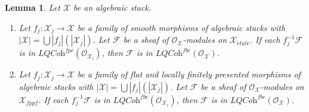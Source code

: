 \documentclass{stacks-project}
\theoremstyle{plain}
\newtheorem{lemma}[subsection]{Lemma}
\theoremstyle{definition}
\theoremstyle{remark}
\numberwithin{equation}{subsection}
\def\etale{{\acute{e}tale}}
\begin{document}
\begin{lemma}
\label{lemma-check-lqc-fbc-on-covering}
Let $\mathcal{X}$ be an algebraic stack.
\begin{enumerate}
\item Let $f_j : \mathcal{X}_j \to \mathcal{X}$ be a family of smooth
morphisms of algebraic stacks with
$|\mathcal{X}| =\bigcup |f_j|(|\mathcal{X}_j|)$.
Let $\mathcal{F}$ be a sheaf of $\mathcal{O}_\mathcal{X}$-modules
on $\mathcal{X}_\etale$. If each $f_j^{-1}\mathcal{F}$
is in $\textit{LQCoh}^{fpc}(\mathcal{O}_{\mathcal{X}_i})$, then
$\mathcal{F}$ is in
$\textit{LQCoh}^{fbc}(\mathcal{O}_\mathcal{X})$.
\item  Let $f_j : \mathcal{X}_j \to \mathcal{X}$ be a family of flat
and locally finitely presented morphisms of algebraic stacks with
$|\mathcal{X}| =\bigcup |f_j|(|\mathcal{X}_j|)$.
Let $\mathcal{F}$ be a sheaf of $\mathcal{O}_\mathcal{X}$-modules
on $\mathcal{X}_{fppf}$. If each $f_j^{-1}\mathcal{F}$
is in $\textit{LQCoh}^{fbc}(\mathcal{O}_{\mathcal{X}_i})$, then
$\mathcal{F}$ is in $\textit{LQCoh}^{fbc}(\mathcal{O}_\mathcal{X})$.
\end{enumerate}
\end{lemma}
\end{document}
